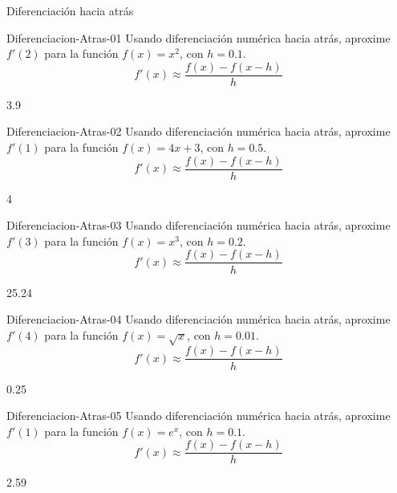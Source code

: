 \documentclass[a4,11pt]{aleph-notas}
\begin{document}
\begin{quiz}{Diferenciación hacia atrás}
\begin{numerical}[tolerance=0.01]%
    {Diferenciacion-Atras-01}
    Usando diferenciación numérica hacia atrás, aproxime \( f'(2) \) para la función \( f(x)=x^2 \), con \( h=0.1 \).
    \[
        f'(x)\approx \frac{f(x)-f(x-h)}{h}
    \]
    \item 3.9
\end{numerical}

\begin{numerical}[tolerance=0.01]%
    {Diferenciacion-Atras-02}
    Usando diferenciación numérica hacia atrás, aproxime \( f'(1) \) para la función \( f(x)=4x+3 \), con \( h=0.5 \).
    \[
        f'(x)\approx \frac{f(x)-f(x-h)}{h}
    \]
    \item 4
\end{numerical}

\begin{numerical}[tolerance=0.01]%
    {Diferenciacion-Atras-03}
    Usando diferenciación numérica hacia atrás, aproxime \( f'(3) \) para la función \( f(x)=x^3 \), con \( h=0.2 \).
    \[
        f'(x)\approx \frac{f(x)-f(x-h)}{h}
    \]
    \item 25.24
\end{numerical}

\begin{numerical}[tolerance=0.01]%
    {Diferenciacion-Atras-04}
    Usando diferenciación numérica hacia atrás, aproxime \( f'(4) \) para la función \( f(x)=\sqrt{x} \), con \( h=0.01 \).
    \[
        f'(x)\approx \frac{f(x)-f(x-h)}{h}
    \]
    \item 0.25
\end{numerical}

\begin{numerical}[tolerance=0.01]%
    {Diferenciacion-Atras-05}
    Usando diferenciación numérica hacia atrás, aproxime \( f'(1) \) para la función \( f(x)=e^x \), con \( h=0.1 \).
    \[
        f'(x)\approx \frac{f(x)-f(x-h)}{h}
    \]
    \item 2.59
\end{numerical}

\end{quiz}
\end{document}
